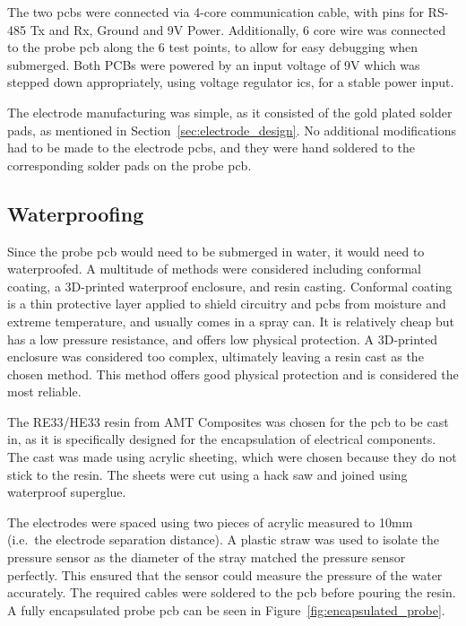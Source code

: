 \hfill \break

The two \gls{pcb}s were connected via 4-core communication cable, with pins for RS-485 Tx and Rx, Ground and 9V Power.
Additionally, 6 core wire was connected to the probe \gls{pcb} along the 6 test points, to allow for easy debugging when submerged.
Both PCBs were powered by an input voltage of 9V which was stepped down appropriately, using voltage regulator \gls{ic}s, for a stable power input.

The electrode manufacturing was simple, as it consisted of the gold plated solder pads, as mentioned in Section~\ref{sec:electrode_design}.
No additional modifications had to be made to the electrode \gls{pcb}s, and they were hand soldered to the corresponding solder pads on the probe \gls{pcb}.

\subsection{Waterproofing}\label{sec:waterproofing}
Since the probe \gls{pcb} would need to be submerged in water, it would need to waterproofed.
A multitude of methods were considered including conformal coating, a 3D-printed waterproof enclosure, and resin casting.
Conformal coating is a thin protective layer applied to shield circuitry and \gls{pcb}s from moisture and extreme temperature, and usually comes in a spray can.
It is relatively cheap but has a low pressure resistance, and offers low physical protection.
A 3D-printed enclosure was considered too complex, ultimately leaving a resin cast as the chosen method.
This method offers good physical protection and is considered the most reliable.

The RE33/HE33 resin from AMT Composites was chosen for the \gls{pcb} to be cast in, as it is specifically designed for the encapsulation of electrical components.
The cast was made using acrylic sheeting, which were chosen because they do not stick to the resin.
The sheets were cut using a hack saw and joined using waterproof superglue.

The electrodes were spaced using two pieces of acrylic measured to 10mm (i.e.~the electrode separation distance).
A plastic straw was used to isolate the pressure sensor as the diameter of the stray matched the pressure sensor perfectly.
This ensured that the sensor could measure the pressure of the water accurately.
The required cables were soldered to the \gls{pcb} before pouring the resin.
A fully encapsulated probe \gls{pcb} can be seen in Figure~\ref{fig:encapsulated_probe}.

